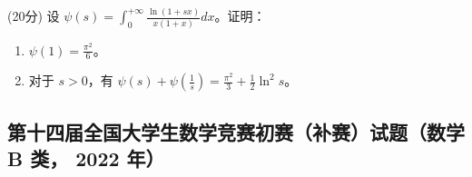 \documentclass[loose]{ExBook}
\begin{document}
\begin{qitems}
    \begin{bbox}
        \qitem (20分) 设 \(\psi(s) = \int_{0}^{+\infty} \frac{\ln(1+sx)}{x(1+x)} dx\)。证明：
        \begin{enumerate}[label=(\arabic*)]
            \item \(\psi(1) = \frac{\pi^2}{6}\)。
            \item 对于 \( s > 0 \)，有 \(\psi(s) + \psi\left(\frac{1}{s}\right) = \frac{\pi^2}{3} + \frac{1}{2} \ln^2 s\)。
        \end{enumerate}
    \end{bbox}
\end{qitems}
\subsection{第十四届全国大学生数学竞赛初赛（补赛）试题（数学 B 类， 2022 年）}
\end{document}

